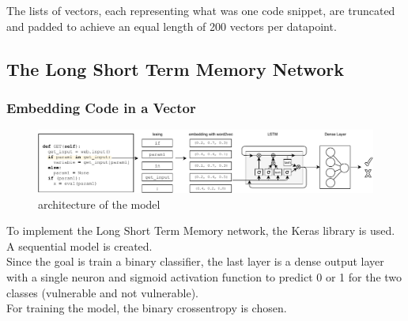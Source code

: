 \documentclass[
	a4paper,
	pagesize,
	pdftex,
	12pt,
	twoside, %
	BCOR=5mm, %
	ngerman,
	fleqn,
	final,
	]{scrartcl}
\begin{document}
The lists of vectors, each representing what was one code snippet, are truncated and padded to achieve an equal length of 200 vectors per datapoint.

\subsection{The Long Short Term Memory Network}

\subsubsection{Embedding Code in a Vector}
\begin{figure}[ht]
	\centering
	\includegraphics[width=\linewidth]{img/Architecture}
	\caption{architecture of the model}
	\label{fig:architecture}
\end{figure}

To implement the Long Short Term Memory network, the Keras library is used. A sequential model is created.\\
Since the goal is train a binary classifier, the last layer is a dense output layer with a single neuron and sigmoid activation function to predict 0 or 1 for the two classes (vulnerable and not vulnerable).\\
For training the model, the binary crossentropy is chosen. \\

\end{document}
